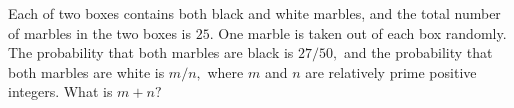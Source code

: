 Each of two boxes contains both black and white marbles, and the total number of marbles in the two boxes is $25.$ One marble is taken out of each box randomly. The probability that both marbles are black is $27/50,$ and the probability that both marbles are white is $m/n,$ where $m$ and $n$ are relatively prime positive integers. What is $m+n?$